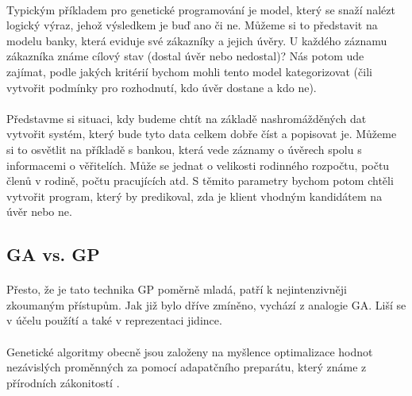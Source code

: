 \documentclass[bc,male,java,dept460]{diploma}		%
\begin{document}
\paragraph*{}
Typickým příkladem pro genetické programování je model, který se snaží nalézt logický výraz, jehož výsledkem je buď ano či ne. Můžeme si to představit na modelu banky, která eviduje své zákazníky a jejich úvěry. U každého záznamu zákazníka známe cílový stav (dostal úvěr nebo nedostal)? Nás potom ude zajímat, podle jakých kritérií bychom mohli tento model kategorizovat (čili vytvořit podmínky pro rozhodnutí, kdo úvěr dostane a kdo ne).

\paragraph*{}
Představme si situaci, kdy budeme chtít na základě nashromážděných dat vytvořit systém, který bude tyto data celkem dobře číst a popisovat je. Můžeme si to osvětlit na příkladě s bankou, která vede záznamy o úvěrech spolu s informacemi o věřitelích. Může se jednat o velikosti rodinného rozpočtu, počtu členů v rodině, počtu pracujících atd. S těmito parametry bychom potom chtěli vytvořit program, který by predikoval, zda je klient vhodným kandidátem na úvěr nebo ne.

\subsection{GA vs. GP}
\paragraph*{}
Přesto, že je tato technika GP poměrně mladá, patří k nejintenzivněji zkoumaným přístupům. Jak již bylo dříve zmíněno, vychází z analogie GA. Liší se v účelu použítí a také v reprezentaci jidince.

\paragraph*{}
Genetické algoritmy obecně jsou založeny na myšlence optimalizace hodnot nezávislých proměnných za pomocí adapatčního preparátu, který známe z přírodních zákonitostí \cite{evoltech}.
\end{document}
